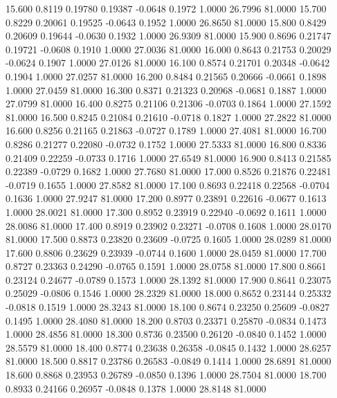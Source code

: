   15.600   0.8119   0.19780   0.19387  -0.0648   0.1972   1.0000  26.7996  81.0000
  15.700   0.8229   0.20061   0.19525  -0.0643   0.1952   1.0000  26.8650  81.0000
  15.800   0.8429   0.20609   0.19644  -0.0630   0.1932   1.0000  26.9309  81.0000
  15.900   0.8696   0.21747   0.19721  -0.0608   0.1910   1.0000  27.0036  81.0000
  16.000   0.8643   0.21753   0.20029  -0.0624   0.1907   1.0000  27.0126  81.0000
  16.100   0.8574   0.21701   0.20348  -0.0642   0.1904   1.0000  27.0257  81.0000
  16.200   0.8484   0.21565   0.20666  -0.0661   0.1898   1.0000  27.0459  81.0000
  16.300   0.8371   0.21323   0.20968  -0.0681   0.1887   1.0000  27.0799  81.0000
  16.400   0.8275   0.21106   0.21306  -0.0703   0.1864   1.0000  27.1592  81.0000
  16.500   0.8245   0.21084   0.21610  -0.0718   0.1827   1.0000  27.2822  81.0000
  16.600   0.8256   0.21165   0.21863  -0.0727   0.1789   1.0000  27.4081  81.0000
  16.700   0.8286   0.21277   0.22080  -0.0732   0.1752   1.0000  27.5333  81.0000
  16.800   0.8336   0.21409   0.22259  -0.0733   0.1716   1.0000  27.6549  81.0000
  16.900   0.8413   0.21585   0.22389  -0.0729   0.1682   1.0000  27.7680  81.0000
  17.000   0.8526   0.21876   0.22481  -0.0719   0.1655   1.0000  27.8582  81.0000
  17.100   0.8693   0.22418   0.22568  -0.0704   0.1636   1.0000  27.9247  81.0000
  17.200   0.8977   0.23891   0.22616  -0.0677   0.1613   1.0000  28.0021  81.0000
  17.300   0.8952   0.23919   0.22940  -0.0692   0.1611   1.0000  28.0086  81.0000
  17.400   0.8919   0.23902   0.23271  -0.0708   0.1608   1.0000  28.0170  81.0000
  17.500   0.8873   0.23820   0.23609  -0.0725   0.1605   1.0000  28.0289  81.0000
  17.600   0.8806   0.23629   0.23939  -0.0744   0.1600   1.0000  28.0459  81.0000
  17.700   0.8727   0.23363   0.24290  -0.0765   0.1591   1.0000  28.0758  81.0000
  17.800   0.8661   0.23124   0.24677  -0.0789   0.1573   1.0000  28.1392  81.0000
  17.900   0.8641   0.23075   0.25029  -0.0806   0.1546   1.0000  28.2329  81.0000
  18.000   0.8652   0.23144   0.25332  -0.0818   0.1519   1.0000  28.3243  81.0000
  18.100   0.8674   0.23250   0.25609  -0.0827   0.1495   1.0000  28.4080  81.0000
  18.200   0.8703   0.23371   0.25870  -0.0834   0.1473   1.0000  28.4856  81.0000
  18.300   0.8736   0.23500   0.26120  -0.0840   0.1452   1.0000  28.5579  81.0000
  18.400   0.8774   0.23638   0.26358  -0.0845   0.1432   1.0000  28.6257  81.0000
  18.500   0.8817   0.23786   0.26583  -0.0849   0.1414   1.0000  28.6891  81.0000
  18.600   0.8868   0.23953   0.26789  -0.0850   0.1396   1.0000  28.7504  81.0000
  18.700   0.8933   0.24166   0.26957  -0.0848   0.1378   1.0000  28.8148  81.0000
